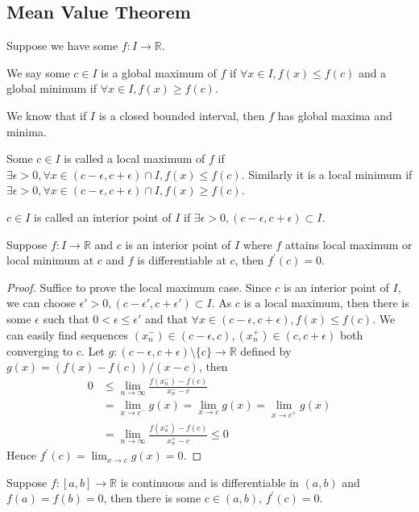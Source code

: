 \subsection{Mean Value Theorem}
Suppose we have some $f:I\to\mathbb R$.
\begin{definition}
    We say some $c\in I$ is a global maximum of $f$ if $\forall x\in I,f(x)\le f(c)$ and a global minimum if $\forall x\in I,f(x)\ge f(c)$.
\end{definition}
We know that if $I$ is a closed bounded interval, then $f$ has global maxima and minima.
\begin{definition}
    Some $c\in I$ is called a local maximum of $f$ if $\exists\epsilon>0,\forall x\in (c-\epsilon,c+\epsilon)\cap I,f(x)\le f(c)$.
    Similarly it is a local minimum if $\exists\epsilon>0,\forall x\in (c-\epsilon,c+\epsilon)\cap I,f(x)\ge f(c)$.
\end{definition}
\begin{definition}
    $c\in I$ is called an interior point of $I$ if $\exists \epsilon>0,(c-\epsilon,c+\epsilon)\subset I$.
\end{definition}
\begin{proposition}
    Suppose $f:I\to\mathbb R$ and $c$ is an interior point of $I$ where $f$ attains local maximum or local minimum at $c$ and $f$ is differentiable at $c$, then $f^\prime(c)=0$.
\end{proposition}
\begin{proof}
    Suffice to prove the local maximum case.
    Since $c$ is an interior point of $I$, we can choose $\epsilon'>0,(c-\epsilon',c+\epsilon')\subset I$.
    As $c$ is a local maximum, then there is some $\epsilon$ such that $0<\epsilon\le\epsilon'$ and that $\forall x\in (c-\epsilon,c+\epsilon),f(x)\le f(c)$.
    We can easily find sequences $(x_n^-)\in (c-\epsilon,c),(x_n^+)\in (c,c+\epsilon)$ both converging to $c$.
    Let $g:(c-\epsilon,c+\epsilon)\setminus\{c\}\to\mathbb R$ defined by $g(x)=(f(x)-f(c))/(x-c)$, then
    \begin{align*}
        0&\le\lim_{n\to\infty}\frac{f(x_n^-)-f(c)}{x_n^--c}\\
        &=\lim_{x\to c^-}g(x)=\lim_{x\to c}g(x)=\lim_{x\to c^+}g(x)\\
        &=\lim_{n\to\infty}\frac{f(x_n^+)-f(c)}{x_n^+-c} \le 0
    \end{align*}
    Hence $f^\prime(c)=\lim_{x\to c}g(x)=0$.
\end{proof}
\begin{theorem}
    Suppose $f:[a,b]\to\mathbb R$ is continuous and is differentiable in $(a,b)$ and $f(a)=f(b)=0$, then there is some $c\in (a,b)$, $f^\prime(c)=0$.
\end{theorem}
